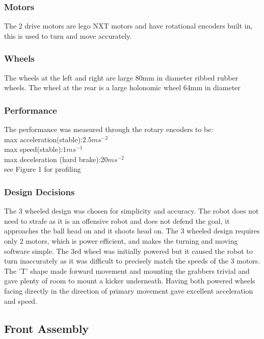 \subsubsection{Motors}
The 2 drive motors are lego NXT motors and have rotational encoders built in, this is used to turn and move accurately. 
\subsubsection{Wheels}
The wheels at the left and right are large 80mm in diameter ribbed rubber wheels. The wheel at the rear is a large holonomic wheel 64mm in diameter
\subsubsection{Performance}
The performance was measured through the rotary encoders to be:\\
max acceleration(stable):$2.5ms^{-2}$\\
max speed(stable):$1ms^{-1}$ \\
max deceleration (hard brake):$20ms^{-2}$\\
see Figure 1 for profiling\\


\subsubsection{Design Decisions}
The 3 wheeled design was chosen for simplicity and accuracy. The robot does not need to strafe as it is an offensive robot and does not defend the goal, it approaches the ball head on and it shoots head on. The 3 wheeled design requires only 2 motors, which is power efficient, and makes the turning and moving software simple. The 3rd wheel was initially powered but it caused the robot to turn inaccurately as it was difficult to precisely match the speeds of the 3 motors. The 'T' shape made forward movement and mounting the grabbers trivial and gave plenty of room to mount a kicker underneath. Having both powered wheels facing directly in the direction of primary movement gave excellent acceleration and speed.


\subsection{Front Assembly}
